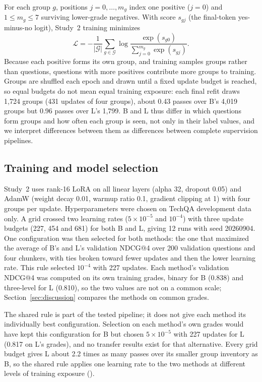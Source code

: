 For each group $g$, positions $j=0,\ldots,m_g$ index one positive ($j=0$) and $1\le m_g\le7$ surviving lower-grade negatives. With score $s_{gj}$ (the final-token yes-minus-no logit), Study~2 training minimizes
\begin{equation}
 \mathcal L=-\frac{1}{|\mathcal G|}\sum_{g\in\mathcal G}\log\frac{\exp(s_{g0})}{\sum_{j=0}^{m_g}\exp(s_{gj})}.
\end{equation}
Because each positive forms its own group, and training samples groups rather than questions, questions with more positives contribute more groups to training. Groups are shuffled each epoch and drawn until a fixed update budget is reached, so equal budgets do not mean equal training exposure: each final refit draws 1,724 groups (431 updates of four groups), about 0.43 passes over B's 4,019 groups but 0.96 passes over L's 1,799. B and L thus differ in which questions form groups and how often each group is seen, not only in their label values, and we interpret differences between them as differences between complete supervision pipelines.

\subsection{Training and model selection}\label{sec:training}
Study~2 uses rank-16 LoRA on all linear layers (alpha 32, dropout 0.05) and AdamW (weight decay 0.01, warmup ratio 0.1, gradient clipping at 1) with four groups per update. Hyperparameters were chosen on TechQA development data only. A grid crossed two learning rates ($5\times10^{-5}$ and $10^{-4}$) with three update budgets (227, 454 and 681) for both B and L, giving 12 runs with seed 20260904. One configuration was then selected for both methods: the one that maximized the average of B's and L's validation NDCG@4 over 200 validation questions and four chunkers, with ties broken toward fewer updates and then the lower learning rate. This rule selected $10^{-4}$ with 227 updates. Each method's validation NDCG@4 was computed on its own training grades, binary for B (0.838) and three-level for L (0.810), so the two values are not on a common scale; Section~\ref{sec:discussion} compares the methods on common grades.

The shared rule is part of the tested pipeline; it does not give each method its individually best configuration. Selection on each method's own grades would have kept this configuration for B but chosen $5\times10^{-5}$ with 227 updates for L (0.817 on L's grades), and no transfer results exist for that alternative. Every grid budget gives L about 2.2 times as many passes over its smaller group inventory as B, so the shared rule applies one learning rate to the two methods at different levels of training exposure ().

